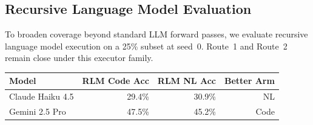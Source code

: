 \subsection{Recursive Language Model Evaluation}
\label{app:recursive_language_model_evaluation}

To broaden coverage beyond standard LLM forward passes, we evaluate recursive
language model execution on a 25\% subset at seed~0. Route~1 and Route~2 remain
close under this executor family.

\begin{center}
\small
\begin{tabular}{lrrr}
\toprule
Model & RLM Code Acc & RLM NL Acc & Better Arm \\
\midrule
Claude Haiku 4.5 & 29.4\% & 30.9\% & NL \\
Gemini 2.5 Pro & 47.5\% & 45.2\% & Code \\
\bottomrule
\end{tabular}
\label{tab:appendix_rlm}
\end{center}

